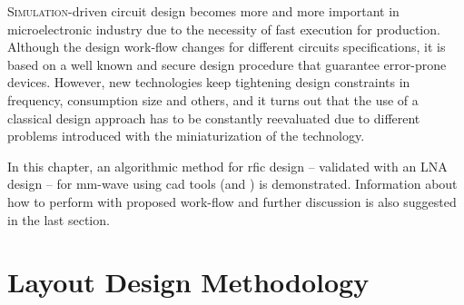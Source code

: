 \vspace*{6cm}
\lettrine[lines=1]{\color{redxlim}S}{imulation}-driven circuit design becomes more and more important in microelectronic industry due to the necessity of fast execution for production. Although the design work-flow changes for different circuits specifications, it is based on a well known and secure design procedure that guarantee error-prone devices. However, new technologies keep tightening design constraints in frequency, consumption size and others, and it turns out that the use of a classical design approach has to be constantly reevaluated due to different problems introduced with the miniaturization of the technology.


In this chapter, an algorithmic method for \gls{rfic} design -- validated with an LNA design -- for mm-wave using \gls{cad} tools (\cadence \virtuoso and \ads \momentum) is demonstrated. Information about how to perform with proposed work-flow and further discussion is also suggested in the last section.


\section{Layout Design Methodology}


